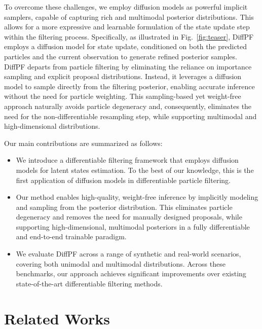 To overcome these challenges, we employ diffusion models as powerful implicit samplers, capable of capturing rich and multimodal posterior distributions. This allows for a more expressive and learnable formulation of the state update step within the filtering process. Specifically, as illustrated in Fig.~\ref{fig:teaser}, DiffPF employs a diffusion model for state update, conditioned on both the predicted particles and the current observation to generate refined posterior samples.
DiffPF departs from particle filtering by eliminating the reliance on importance sampling and explicit proposal distributions. Instead, it leverages a diffusion model to sample directly from the filtering posterior, enabling accurate inference without the need for particle weighting. This sampling-based yet weight-free approach naturally avoids particle degeneracy and, consequently, eliminates the need for the non-differentiable resampling step, while supporting multimodal and high-dimensional distributions.

Our main contributions are summarized as follows:
\begin{itemize}
    \item We introduce a differentiable filtering framework that employs diffusion models for latent states estimation. To the best of our knowledge, this is the first application of diffusion models in differentiable particle filtering.
    \item Our method enables high-quality, weight-free inference by implicitly modeling and sampling from the posterior distribution. This eliminates particle degeneracy and removes the need for manually designed proposals, while supporting high-dimensional, multimodal posteriors in a fully differentiable and end-to-end trainable paradigm.
    \item We evaluate DiffPF across a range of synthetic and real-world scenarios, covering both unimodal and multimodal distributions. Across these benchmarks, our approach achieves significant improvements over existing state-of-the-art differentiable filtering methods.
\end{itemize}

\section{Related Works}
